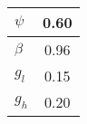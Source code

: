 \begin{tiny}\begin{tabular}{|l|c|}
\hline
\textbf{$\psi$}&0.60\\\hline
\textbf{$\beta$}&0.96\\\hline
\textbf{$g_{l}$}&0.15\\\hline
\textbf{$g_{h}$}&0.20\\\hline
\end{tabular}
\end{tiny}